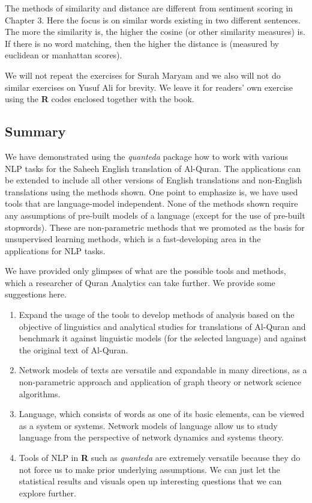 \documentclass[
]{article}
\begin{document}
The methods of similarity and distance are different from sentiment scoring in Chapter 3. Here the focus is on similar words existing in two different sentences. The more the similarity is, the higher the cosine (or other similarity measures) is. If there is no word matching, then the higher the distance is (measured by euclidean or manhattan scores).

We will not repeat the exercises for Surah Maryam and we also will not do similar exercises on Yusuf Ali for brevity. We leave it for readers' own exercise using the \textbf{R} codes enclosed together with the book.

\hypertarget{summary-chapter-7}{%
\subsection{Summary}\label{summary-chapter-7}}

We have demonstrated using the \emph{quanteda} package how to work with various NLP tasks for the Saheeh English translation of Al-Quran. The applications can be extended to include all other versions of English translations and non-English translations using the methods shown. One point to emphasize is, we have used tools that are language-model independent. None of the methods shown require any assumptions of pre-built models of a language (except for the use of pre-built stopwords). These are non-parametric methods that we promoted as the basis for unsupervised learning methods, which is a fast-developing area in the applications for NLP tasks.

We have provided only glimpses of what are the possible tools and methods, which a researcher of Quran Analytics can take further. We provide some suggestions here.

\begin{enumerate}
\def\labelenumi{\arabic{enumi}.}
\item
  Expand the usage of the tools to develop methods of analysis based on the objective of linguistics and analytical studies for translations of Al-Quran and benchmark it against linguistic models (for the selected language) and against the original text of Al-Quran.
\item
  Network models of texts are versatile and expandable in many directions, as a non-parametric approach and application of graph theory or network science algorithms.
\item
  Language, which consists of words as one of its basic elements, can be viewed as a system or systems. Network models of language allow us to study language from the perspective of network dynamics and systems theory.
\item
  Tools of NLP in \textbf{R} such as \emph{quanteda} are extremely versatile because they do not force us to make prior underlying assumptions. We can just let the statistical results and visuals open up interesting questions that we can explore further.
\end{enumerate}
\end{document}
